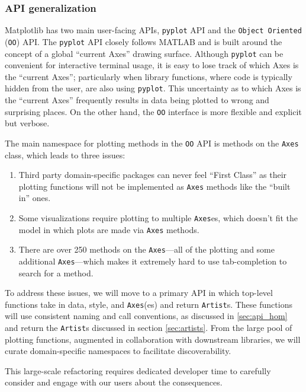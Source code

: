 \documentclass[11pt,letterpaper]{article}  %
\begin{document}
\subsubsection{API generalization}
\label{sec:api_gen}
Matplotlib has two main user-facing APIs, \texttt{pyplot} API
and the \texttt{Object Oriented} (\texttt{OO})
API.  The \texttt{pyplot} API closely follows MATLAB and is built
around the concept of a global ``current Axes'' drawing surface.
Although \texttt{pyplot} can be convenient for interactive terminal
usage, it is easy to lose track of which Axes is the ``current Axes'';
particularly when library functions, where code is typically hidden
from the user, are also using \texttt{pyplot}.
This uncertainty as to which Axes is the ``current Axes'' frequently results in data being
plotted to wrong and surprising places. On the other hand, the \texttt{OO} interface is more flexible and
explicit but verbose.

The main namespace for plotting methods in the \texttt{OO} API is
methods on the \texttt{Axes} class, which leads to three issues:
\begin{enumerate}
\item Third party domain-specific packages can never feel ``First
Class'' as their plotting functions will not be implemented as
\texttt{Axes} methods like the ``built in'' ones.
\item Some visualizations require plotting to multiple \texttt{Axes}es, which
doesn't fit the model in which plots are made via \texttt{Axes} methods.
\item There are over 250 methods on the \texttt{Axes}---all of the
plotting and some additional \texttt{Axes}---which makes it extremely hard to use tab-completion to
search for a method.
\end{enumerate}

To address these issues, we will move to a primary API in which
top-level functions take in data, style, and \texttt{Axes}(es) and
return \texttt{Artist}s.  These functions will use consistent naming
and call conventions, as discussed in \ref{sec:api_hom} and return the
\texttt{Artist}s discussed in section \ref{sec:artists}. From the
large pool of plotting functions, augmented in collaboration with
downstream libraries, we will curate domain-specific namespaces to
facilitate discoverability.

This large-scale refactoring requires dedicated developer time to
carefully consider and engage with our users about the consequences.
\end{document}
